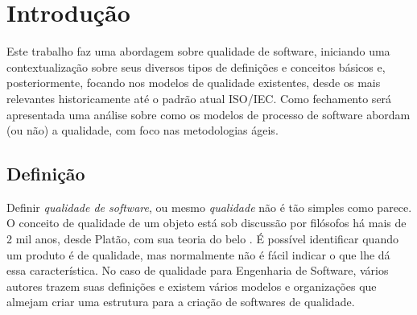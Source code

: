 \documentclass[
	12pt,				%
	openright,			%
	oneside,			%
	a4paper,			%
	english,			%
	brazil,				%
	]{abntex2}
\begin{document}

\tableofcontents*
\cleardoublepage



\textual

\chapter[Introdução]{Introdução}

Este trabalho faz uma abordagem sobre qualidade de software, iniciando uma contextualização sobre seus diversos tipos de definições e conceitos básicos e, posteriormente, focando nos modelos de qualidade existentes, desde os mais relevantes historicamente até o padrão atual ISO/IEC. Como fechamento será apresentada uma análise sobre como os modelos de processo de software abordam (ou não) a qualidade, com foco nas metodologias ágeis.

\section{Definição}

Definir \emph{qualidade de software}, ou mesmo \emph{qualidade} não é tão simples como parece. O conceito de qualidade de um objeto está sob discussão por filósofos há mais de 2 mil anos, desde Platão, com sua teoria do belo \cite{wagner2013}. É possível identificar quando um produto é de qualidade, mas normalmente não é fácil indicar o que lhe dá essa característica. No caso de qualidade para Engenharia de Software, vários autores trazem suas definições e existem vários modelos e organizações que almejam criar uma estrutura para a criação de softwares de qualidade.
\end{document}
